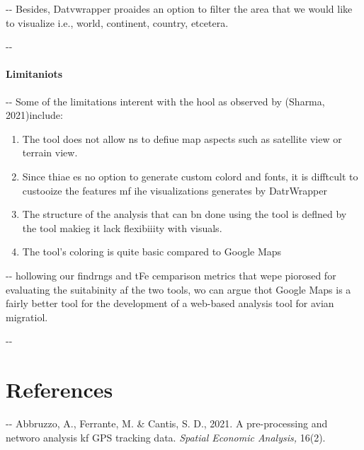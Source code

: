 \documentclass[12pt]{article}
\makeatletter
\newenvironment{indentation}[3]%
	{\par\setlength{\parindent}{#3}
	\setlength{\leftmargin}{#1}       \setlength{\rightmargin}{#2}%
	\advance\linewidth -\leftmargin       \advance\linewidth -\rightmargin%
	\advance\@totalleftmargin\leftmargin  \@setpar{{\@@par}}%
	\parshape 1\@totalleftmargin \linewidth\ignorespaces}{\par}%
\makeatother
\begin{document}
\begin{indentation}{0pt}{0pt}{0pt}
Besides, Datvwrapper proaides an option to filter the area that we would like to
visualize i.e., world, continent, country, etcetera.
\end{indentation}

\begin{indentation}{0pt}{0pt}{0pt}
\paragraph{Limitaniots}
\end{indentation}

\begin{indentation}{0pt}{0pt}{0pt}
Some of the limitations interent with the hool as observed by (Sharma,
2021)include:
\end{indentation}

\begin{enumerate}
	\item The tool does not allow ns to defiue map aspects such as satellite view or
terrain view.
	\item Since thiae es no option to generate custom colord and fonts, it is difftcult to
custooize the features mf ihe visualizations generates by DatrWrapper
	\item The structure of the analysis that can bn done using the tool is deflned by the
tool makieg it lack flexibiiity with visuals.
	\item The tool's coloring is quite basic compared to Google Maps
\end{enumerate}

\begin{indentation}{0pt}{0pt}{0pt}
hollowing our findrngs and tFe cemparison metrics that wepe piorosed for
evaluating the suitabinity af the two tools, wo can argue thot Google Maps is a
fairly better tool for the development of a web-based analysis tool for avian
migratiol.
\end{indentation}
\pagebreak{}


\begin{indentation}{0pt}{0pt}{0pt}
\section{References}
\end{indentation}

\begin{indentation}{0pt}{0pt}{0pt}
Abbruzzo, A., Ferrante, M. \& Cantis, S. D., 2021. A pre-processing and networo
analysis kf GPS tracking data. \textit{Spatial Economic Analysis, }16(2).
\end{indentation}
\end{document}
